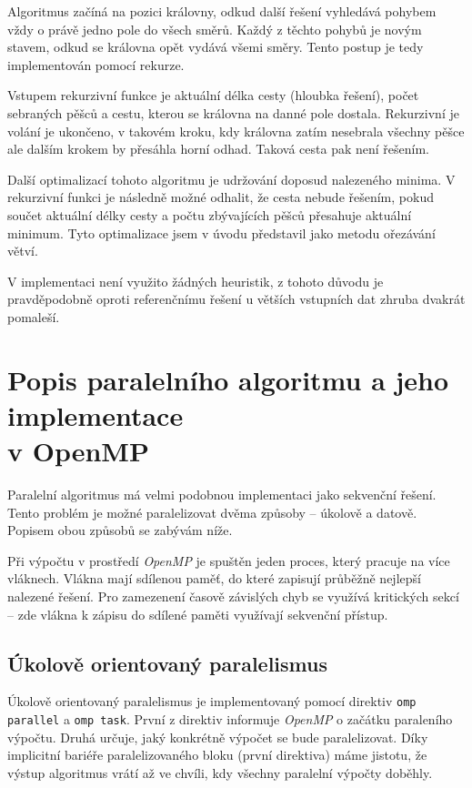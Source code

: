 \documentclass[czech]{article}
\begin{document}
Algoritmus začíná na pozici královny, odkud další řešení vyhledává pohybem vždy o právě jedno pole do všech směrů.
Každý z těchto pohybů je novým stavem, odkud se královna opět vydává všemi směry.
Tento postup je tedy implementován pomocí rekurze.

Vstupem rekurzivní funkce je aktuální délka cesty (hloubka řešení), počet sebraných pěšců a cestu, kterou se královna na danné pole dostala.
Rekurzivní je volání je ukončeno, v takovém kroku, kdy královna zatím nesebrala všechny pěšce ale dalším krokem by přesáhla horní odhad.
Taková cesta pak není řešením.

Další optimalizací tohoto algoritmu je udržování doposud nalezeného minima.
V rekurzivní funkci je následně možné odhalit, že cesta nebude řešením, pokud součet aktuální délky cesty a počtu zbývajících pěšců přesahuje aktuální minimum.
Tyto optimalizace jsem v úvodu představil jako metodu ořezávání větví.

V implementaci není využito žádných heuristik, z tohoto důvodu je pravděpodobně oproti referenčnímu řešení u větších vstupních dat zhruba dvakrát pomaleší.

\section{Popis paralelního algoritmu a jeho implementace\\v OpenMP}

Paralelní algoritmus má velmi podobnou implementaci jako sekvenční řešení.
Tento problém je možné paralelizovat dvěma způsoby -- úkolově a datově.
Popisem obou způsobů se zabývám níže.

Při výpočtu v prostředí \textit{OpenMP} je spuštěn jeden proces, který pracuje na více vláknech.
Vlákna mají sdílenou paměť, do které zapisují průběžně nejlepší nalezené řešení.
Pro zamezenení časově závislých chyb se využívá kritických sekcí -- zde vlákna k zápisu do sdílené paměti využívají sekvenční přístup.

\subsection{Úkolově orientovaný paralelismus}

Úkolově orientovaný paralelismus je implementovaný pomocí direktiv \texttt{omp parallel} a \texttt{omp task}.
První z direktiv informuje \textit{OpenMP} o začátku paraleního výpočtu.
Druhá určuje, jaký konkrétně výpočet se bude paralelizovat.
Díky implicitní bariéře paralelizovaného bloku (první direktiva) máme jistotu, že výstup algoritmus vrátí až ve chvíli, kdy všechny paralelní výpočty doběhly.
\end{document}
